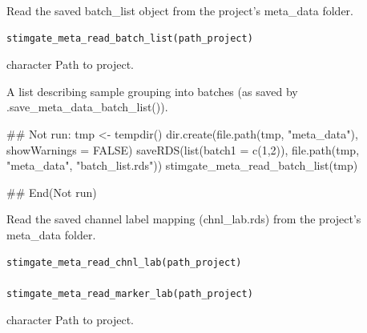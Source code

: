 \documentclass[letterpaper]{book}
\begin{document}
%
\begin{Description}
Read the saved batch\_list object from the project's meta\_data folder.
\end{Description}
%
\begin{Usage}
\begin{verbatim}
stimgate_meta_read_batch_list(path_project)
\end{verbatim}
\end{Usage}
%
\begin{Arguments}
\begin{ldescription}
\item[\code{path\_project}] character Path to project.
\end{ldescription}
\end{Arguments}
%
\begin{Value}
A list describing sample grouping into batches (as saved by .save\_meta\_data\_batch\_list()).
\end{Value}
%
\begin{Examples}
\begin{ExampleCode}
## Not run: 
tmp <- tempdir()
dir.create(file.path(tmp, "meta_data"), showWarnings = FALSE)
saveRDS(list(batch1 = c(1,2)), file.path(tmp, "meta_data", "batch_list.rds"))
stimgate_meta_read_batch_list(tmp)

## End(Not run)
\end{ExampleCode}
\end{Examples}
%
\begin{Description}
Read the saved channel label mapping (chnl\_lab.rds) from the project's meta\_data folder.
\end{Description}
%
\begin{Usage}
\begin{verbatim}
stimgate_meta_read_chnl_lab(path_project)

stimgate_meta_read_marker_lab(path_project)
\end{verbatim}
\end{Usage}
%
\begin{Arguments}
\begin{ldescription}
\item[\code{path\_project}] character Path to project.
\end{ldescription}
\end{Arguments}
\end{document}

